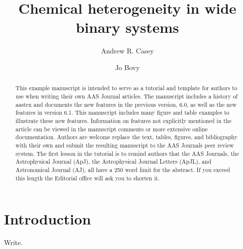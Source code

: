 \documentclass{aastex61}
\begin{document}
\title{Chemical heterogeneity in wide binary systems}


\author[0000-0003-0174-0564]{Andrew R. Casey}

\author[0000-0001-6855-442X]{Jo Bovy}


\begin{abstract}
This example manuscript is intended to serve as a tutorial and template for
authors to use when writing their own AAS Journal articles. The manuscript
includes a history of aastex and documents the new features in the
previous version, 6.0, as well as the new features in version 6.1. This
manuscript includes many figure and table examples to illustrate these new
features.  Information on features not explicitly mentioned in the article
can be viewed in the manuscript comments or more extensive online
documentation. Authors are welcome replace the text, tables, figures, and
bibliography with their own and submit the resulting manuscript to the AAS
Journals peer review system.  The first lesson in the tutorial is to remind
authors that the AAS Journals, the Astrophysical Journal (ApJ), the
Astrophysical Journal Letters (ApJL), and Astronomical Journal (AJ), all
have a 250 word limit for the abstract.  If you exceed this length the
Editorial office will ask you to shorten it.
\end{abstract}

\keywords{}

\section{Introduction} 
\label{sec:introduction}
Write.
\end{document}

